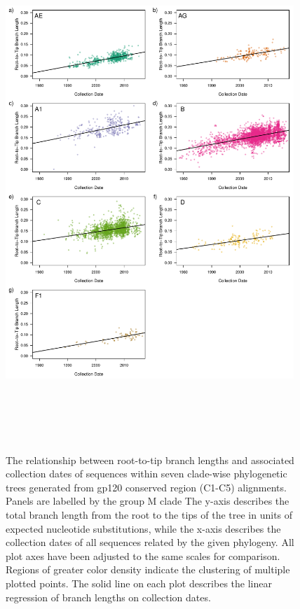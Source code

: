 \documentclass[12pt]{article}
\begin{document}
\begin{figure}
    \includegraphics[height=195mm, width=0.97\textwidth]{branch-lengths}
    \caption{%
    The relationship between root-to-tip branch lengths and associated collection dates of sequences within seven clade-wise phylogenetic trees generated from gp120 conserved region (C1-C5) alignments.
    Panels are labelled by the group M clade
    The y-axis describes the total branch length from the root to the tips of the tree in units of expected nucleotide substitutions, while the x-axis describes the collection dates of all sequences related by the given phylogeny. 
    All plot axes have been adjusted to the same scales for comparison. 
    Regions of greater color density indicate the clustering of multiple plotted points.  
    The solid line on each plot describes the linear regression of branch lengths on collection dates. 
    }
	\centering
   
    \label{branch-lengths}
\end{figure}
\end{document}
